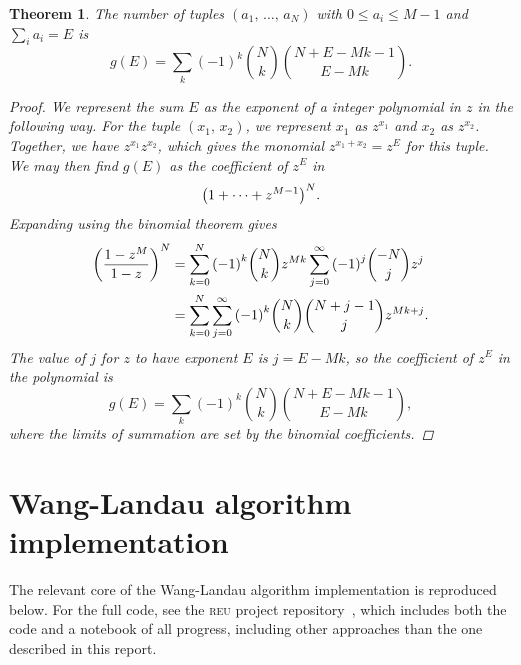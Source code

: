 \documentclass[aps,reprint]{revtex4-2}
\theoremstyle{plain}
\newtheorem{thm}{Theorem}[section]
\theoremstyle{definition}
\renewcommand\leq\leqslant%
\begin{document}
\begin{thm}\label{thm:bw-g}
  The number of tuples $(a_1,\, \ldots,\, a_N)$ with $0 \leq a_i \leq M - 1$ and
  $\sum_i a_i = E$ is
  \[
    g(E)
    = \sum_k {(-1)}^k \binom{N}{k} \binom{N + E - Mk - 1}{E - Mk}.
  \]
  \begin{proof}
    We represent the sum $E$ as the exponent of a integer polynomial in $z$ in
    the following way. For the tuple $(x_1,\, x_2)$, we represent $x_1$ as
    $z^{x_1}$ and $x_2$ as $z^{x_2}$. Together, we have $z^{x_1} z^{x_2}$,
    which gives the monomial $z^{x_1 + x_2} = z^E$ for this tuple. We may then
    find $g(E)$ as the coefficient of $z^E$ in
    \[
      {\qty(1 + \cdots + z^{M-1})}^N.
    \]
    Expanding using the binomial theorem gives
    \begin{align}
      {\qty(\frac{1 - z^M}{1 - z})}^N
      &= \sum_{k=0}^N {(-1)}^k \binom{N}{k} z^{Mk}
      \sum_{j=0}^\infty {(-1)}^j \binom{-N}{j} z^j \\
      &= \sum_{k=0}^N \sum_{j=0}^\infty {(-1)}^k \binom{N}{k}
      \binom{N + j - 1}{j} z^{Mk + j}.
    \end{align}
    The value of $j$ for $z$ to have exponent $E$ is $j = E - Mk$, so the
    coefficient of $z^E$ in the polynomial is
    \begin{equation}
      g(E)
      = \sum_k {(-1)}^k \binom{N}{k} \binom{N + E - Mk - 1}{E - Mk},
    \end{equation}
    where the limits of summation are set by the binomial coefficients.
  \end{proof}
\end{thm}

\section{Wang-Landau algorithm implementation}\label{sec:wanglandau-core}

The relevant core of the Wang-Landau algorithm implementation is reproduced
below. For the full code, see the \textsc{reu} project
repository~\cite{rpi-reu-notebook}, which includes both the code and a notebook
of all progress, including other approaches than the one described in this
report.

\inputminted{python}{wanglandau-core.py}

\hypersetup{urlcolor=Mahogany}

\end{document}
